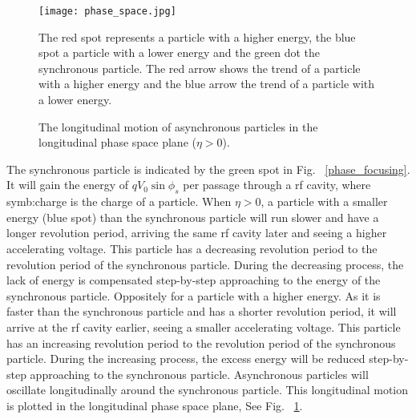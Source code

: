 \begin{figure}[!htb]
   \centering   
   \texttt{[image: phase\_space.jpg]}
   \caption{The longitudinal motion of asynchronous particles in the longitudinal phase space plane ($\eta > 0$).}{The red spot represents a particle with a higher energy, the blue spot a particle with a lower energy and the green dot the synchronous particle. The red arrow shows the trend of a particle with a higher energy and the blue arrow the trend of a particle with a lower energy.}
   \label{phase_space}
\end{figure}
The synchronous particle is indicated by the green spot in Fig. ~\ref{phase_focusing}. It will gain the energy of $qV_0\sin\phi_{\mathit{s}}$ per passage through a rf cavity, where \gls{symb:charge} is the charge of a particle.  When $\eta > 0$, a particle with a smaller energy (blue spot) than the synchronous particle will run slower and have a longer revolution period, arriving the same rf cavity later and seeing a higher accelerating voltage. This particle has a decreasing revolution period to the revolution period of the synchronous particle. During the decreasing process, the lack of energy is compensated step-by-step approaching to the energy of the synchronous particle. Oppositely for a particle with a higher energy. As it is faster than the synchronous particle and has a shorter revolution period, it will arrive at the rf cavity earlier, seeing a smaller accelerating voltage. This particle has an increasing revolution period to the revolution period of the synchronous particle. During the increasing process, the excess energy will be reduced step-by-step approaching to the synchronous particle. Asynchronous particles will oscillate longitudinally around the synchronous particle. This longitudinal motion is plotted in the longitudinal phase space plane, See Fig. ~\ref{phase_space}.

